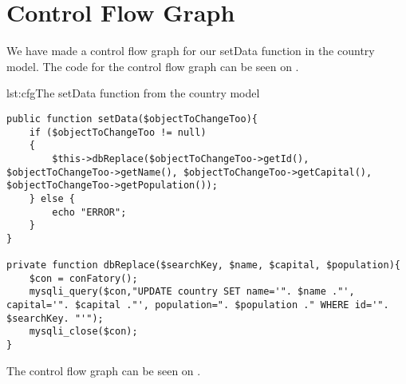 \section{Control Flow Graph}
We have made a control flow graph for our setData function in the country model. The code for the control flow graph can be seen on .
\begin{code}{lst:cfg}{The setData function from the country model}
\begin{lstlisting}
public function setData($objectToChangeToo){
	if ($objectToChangeToo != null)
	{	
		$this->dbReplace($objectToChangeToo->getId(), $objectToChangeToo->getName(), $objectToChangeToo->getCapital(), $objectToChangeToo->getPopulation());
	} else {
		echo "ERROR";
	}
}

private function dbReplace($searchKey, $name, $capital, $population){
	$con = conFatory();
	mysqli_query($con,"UPDATE country SET name='". $name ."', capital='". $capital ."', population=". $population ." WHERE id='". $searchKey. "'");
	mysqli_close($con);
}
\end{lstlisting}
\end{code}

The control flow graph can be seen on .
